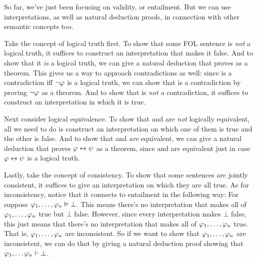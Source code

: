 So far, we've just been focusing on validity, or entailment. But we can use interpretations, as well as natural deduction proofs, in connection with other semantic concepts too.

Take the concept of logical truth first.  To show that some FOL sentence \meta{\varphi} is \emph{not} a logical truth, it suffices to construct an interpretation that makes it false.  And to show that it \emph{is} a logical truth, we can give a natural deduction that proves \meta{\varphi} as a theorem.  This gives us a way to approach contradictions as well: since \meta{\varphi} is a contradiction iff $\neg\mathcal{\varphi}$ is a logical truth, we can show that \meta{\varphi} is a contradiction by proving $\neg\mathcal{\varphi}$ as a theorem.  And to show that \meta{\varphi} is \emph{not} a contradiction, it suffices to construct an interpretation in which it is true.


Next consider logical equivalence.  To show that \meta{\varphi} and \meta{\psi} are \emph{not} logically equivalent, all we need to do is construct an interpretation on which one of them is true and the other is false.  And to show that \meta{\varphi} and \meta{\psi} \emph{are} equivalent, we can give a natural deduction that proves $\mathcal{\varphi} \leftrightarrow \mathcal{\psi}$ as a theorem, since \meta{\varphi} and \meta{\psi} are equivalent just in case $\mathcal{\varphi} \leftrightarrow \mathcal{\psi}$ is a logical truth.


Lastly, take the concept of consistency.  To show that some sentences are jointly consistent, it suffices to give an interpretation on which they are all true.  As for inconsistency, notice that it connects to entailment in the following way:
For suppose  $\mathcal{\varphi}_1, \ldots, \mathcal{\varphi}_n \vDash \bot$.  This means there's no interpretation that makes all of $\mathcal{\varphi}_1, \ldots, \mathcal{\varphi}_n $ true but $\bot$ false.  However, since every interpretation makes $\bot$ false, this just means that there's no interpretation that makes all of $\mathcal{\varphi}_1, \ldots, \mathcal{\varphi}_n $ true.  That is, $\mathcal{\varphi}_1, \ldots, \mathcal{\varphi}_n $ are inconsistent.    So if we want to show that $\mathcal{\varphi}_1, \ldots, \mathcal{\varphi}_n $ are inconsistent, we can do that by giving a natural deduction proof showing that $\mathcal{\varphi}_1, \ldots \mathcal{\varphi}_n \vdash \bot $.

